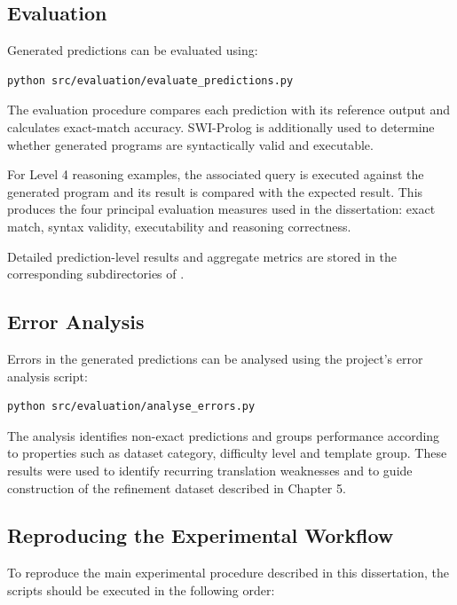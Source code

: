 \documentclass[11pt]{article} %
\theoremstyle{plain}
\theoremstyle{definition}
\begin{document}
\subsection{Evaluation}

Generated predictions can be evaluated using:

\begin{lstlisting}
python src/evaluation/evaluate_predictions.py
\end{lstlisting}

The evaluation procedure compares each prediction with its reference output
and calculates exact-match accuracy. SWI-Prolog is additionally used to
determine whether generated programs are syntactically valid and executable.

For Level 4 reasoning examples, the associated query is executed against the
generated program and its result is compared with the expected result. This
produces the four principal evaluation measures used in the dissertation:
exact match, syntax validity, executability and reasoning correctness.

Detailed prediction-level results and aggregate metrics are stored in the
corresponding subdirectories of .


\subsection{Error Analysis}

Errors in the generated predictions can be analysed using the project's error
analysis script:

\begin{lstlisting}
python src/evaluation/analyse_errors.py
\end{lstlisting}

The analysis identifies non-exact predictions and groups performance according
to properties such as dataset category, difficulty level and template group.
These results were used to identify recurring translation weaknesses and to
guide construction of the refinement dataset described in Chapter 5.


\subsection{Reproducing the Experimental Workflow}

To reproduce the main experimental procedure described in this dissertation,
the scripts should be executed in the following order:
\end{document}

